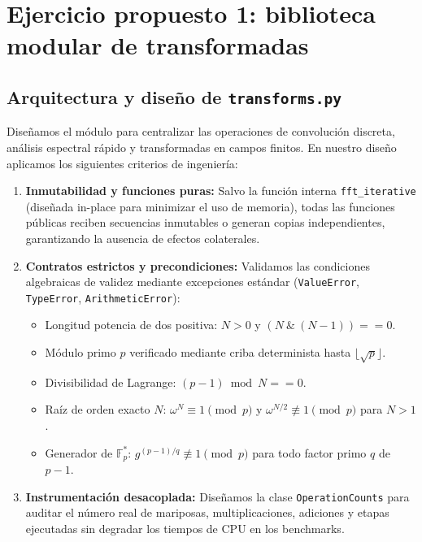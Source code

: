 \section{Ejercicio propuesto 1: biblioteca modular de transformadas}

\subsection{Arquitectura y diseño de \texttt{transforms.py}}
Diseñamos el módulo  para centralizar las operaciones de convolución discreta, análisis espectral rápido y transformadas en campos finitos. En nuestro diseño aplicamos los siguientes criterios de ingeniería:
\begin{enumerate}
    \item \textbf{Inmutabilidad y funciones puras:} Salvo la función interna \texttt{fft\_iterative} (diseñada in-place para minimizar el uso de memoria), todas las funciones públicas reciben secuencias inmutables o generan copias independientes, garantizando la ausencia de efectos colaterales.
    \item \textbf{Contratos estrictos y precondiciones:} Validamos las condiciones algebraicas de validez mediante excepciones estándar (\texttt{ValueError}, \texttt{TypeError}, \texttt{ArithmeticError}):
    \begin{itemize}
        \item Longitud potencia de dos positiva: $N > 0$ y $(N \ \& \ (N - 1)) == 0$.
        \item Módulo primo $p$ verificado mediante criba determinista hasta $\lfloor\sqrt{p}\rfloor$.
        \item Divisibilidad de Lagrange: $(p - 1) \bmod N == 0$.
        \item Raíz de orden exacto $N$: $\omega^N \equiv 1 \pmod p$ y $\omega^{N/2} \not\equiv 1 \pmod p$ para $N > 1$.
        \item Generador de $\mathbb{F}_p^*$: $g^{(p-1)/q} \not\equiv 1 \pmod p$ para todo factor primo $q$ de $p-1$.
    \end{itemize}
    \item \textbf{Instrumentación desacoplada:} Diseñamos la clase \texttt{OperationCounts} para auditar el número real de mariposas, multiplicaciones, adiciones y etapas ejecutadas sin degradar los tiempos de CPU en los benchmarks.
\end{enumerate}

